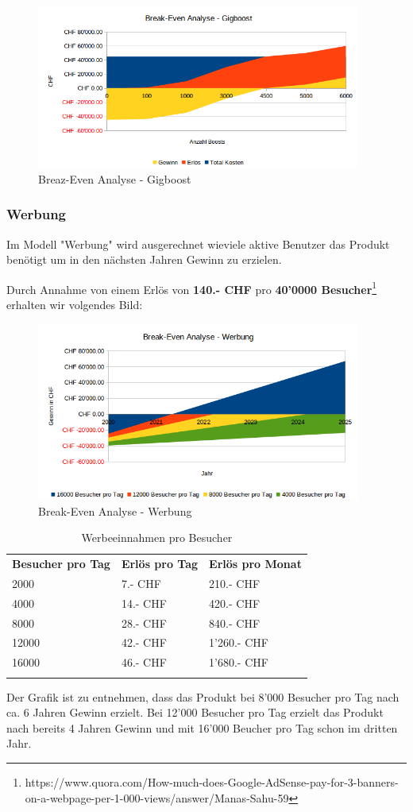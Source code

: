 \begin{figure}[!htb]
  \centering
  \includegraphics[width=0.95\textwidth]{initialisierung/wirtschaftlichkeit-gigboost.png}
  \caption{Breaz-Even Analyse - Gigboost}
\end{figure}

\clearpage
\subsubsection{Werbung}

Im Modell "Werbung" wird ausgerechnet wieviele aktive Benutzer das Produkt benötigt
um in den nächsten Jahren Gewinn zu erzielen.

Durch Annahme von einem Erlös von \textbf{140.- CHF} pro \textbf{40'0000 Besucher}\footnote{https://www.quora.com/How-much-does-Google-AdSense-pay-for-3-banners-on-a-webpage-per-1-000-views/answer/Manas-Sahu-59} erhalten wir volgendes Bild:

\begin{figure}[!htb]
  \centering
  \includegraphics[width=0.95\textwidth]{initialisierung/wirtschaftlichkeit-werbung.png}
  \caption{Break-Even Analyse - Werbung}
\end{figure}

\begin{longtable}[]{@{}lll@{}}
  \toprule
  \textbf{Besucher pro Tag} & \textbf{Erlös pro Tag} & \textbf{Erlös pro Monat}\tabularnewline
  2000                      & 7.- CHF                & 210.- CHF\tabularnewline
  4000                      & 14.- CHF               & 420.- CHF\tabularnewline
  8000                      & 28.- CHF               & 840.- CHF\tabularnewline
  12000                     & 42.- CHF               & 1'260.- CHF\tabularnewline
  16000                     & 46.- CHF               & 1'680.- CHF\tabularnewline
  \bottomrule
  \caption{Werbeeinnahmen pro Besucher}
\end{longtable}

Der Grafik ist zu entnehmen, dass das Produkt bei 8'000 Besucher pro Tag nach ca. 6 Jahren Gewinn erzielt. Bei 12'000 Besucher pro Tag erzielt das Produkt nach bereits 4 Jahren Gewinn und mit 16'000 Beucher pro Tag schon im dritten Jahr.

